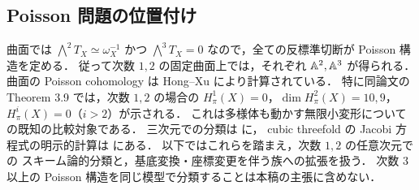 \subsection{Poisson 問題の位置付け}
曲面では $\bigwedge^2T_X\simeq\omega_X^{-1}$ かつ
$\bigwedge^3T_X=0$ なので，全ての反標準切断が Poisson 構造を定める．
従って次数 $1,2$ の固定曲面上では，それぞれ $\mathbb A^2,\mathbb A^3$ が得られる．
曲面の Poisson cohomology は Hong--Xu \cite{HongXu2011} により計算されている．
特に同論文の Theorem 3.9 では，次数 $1,2$ の場合の
$H^1_\pi(X)=0$，$\dim H^2_\pi(X)=10,9$，$H^i_\pi(X)=0$（$i>2$）が示される．
これは多様体も動かす無限小変形についての既知の比較対象である．
三次元での分類は \cite[Theorems 7.1, 9.1]{LPT2013} に，
cubic threefold の Jacobi 方程式の明示的計算は
\cite[Theorem 1 and the subsequent Remark]{Mayanskiy2015} にある．
以下ではこれらを踏まえ，次数 $1,2$ の任意次元での
スキーム論的分類と，基底変換・座標変更を伴う族への拡張を扱う．
次数 $3$ 以上の Poisson 構造を同じ模型で分類することは本稿の主張に含めない．
